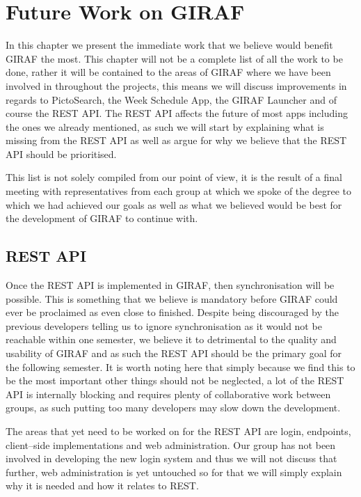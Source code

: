 \chapter{Future Work on GIRAF}\label{chp:futureworks}
In this chapter we present the immediate work that we believe would benefit GIRAF the most.
This chapter will not be a complete list of all the work to be done, rather it will be contained to the areas of GIRAF where we have been involved in throughout the projects, this means we will discuss improvements in regards to PictoSearch, the Week Schedule App, the GIRAF Launcher and of course the REST API.
The REST API affects the future of most apps including the ones we already mentioned, as such we will start by explaining what is missing from the REST API as well as argue for why we believe that the REST API should be prioritised.

This list is not solely compiled from our point of view, it is the result of a final meeting with representatives from each group at which we spoke of the degree to which we had achieved our goals as well as what we believed would be best for the development of GIRAF to continue with.

\section{REST API}
Once the REST API is implemented in GIRAF, then synchronisation will be possible.
This is something that we believe is mandatory before GIRAF could ever be proclaimed as even close to finished.
Despite being discouraged by the previous developers telling us to ignore synchronisation as it would not be reachable within one semester, we believe it to detrimental to the quality and usability of GIRAF and as such the REST API should be the primary goal for the following semester.
It is worth noting here that simply because we find this to be the most important other things should not be neglected, a lot of the REST API is internally blocking and requires plenty of collaborative work between groups, as such putting too many developers may slow down the development.

The areas that yet need to be worked on for the REST API are login, endpoints, client--side implementations and web administration.
Our group has not been involved in developing the new login system and thus we will not discuss that further, web administration is yet untouched so for that we will simply explain why it is needed and how it relates to REST.

